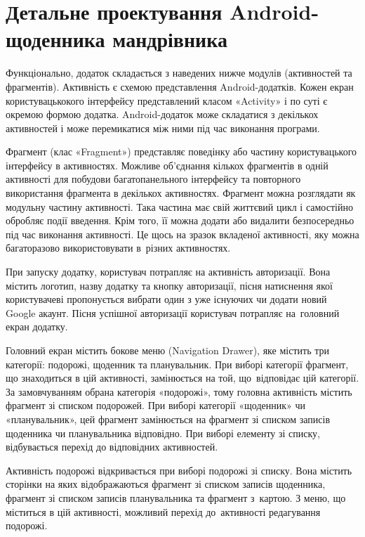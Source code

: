 \documentclass[../main.tex]{subfiles}
\begin{document}
\section{Детальне проектування Android-щоденника мандрівника}
Функціонально, додаток складається з наведених нижче модулів (активностей та фрагментів). Активність є схемою представлення Android-додатків. Кожен екран користувацькокого інтерфейсу представлений класом «Activity» і по суті є окремою формою додатка. Android-додаток може складатися з декількох активностей і може перемикатися між ними під час виконання програми. 

Фрагмент (клас «Fragment») представляє поведінку або частину користувацького інтерфейсу в активностях. Можливе об'єднання кількох фрагментів в одній активності для побудови багатопанельного інтерфейсу та повторного використання фрагмента в декількох активностях. Фрагмент можна розглядати як модульну частину активності. Така частина має свій життєвий цикл і самостійно обробляє події введення. Крім того, її можна додати або видалити безпосередньо під час виконання активності. Це щось на зразок вкладеної активності, яку можна багаторазово використовувати в~різних активностях.

При запуску додатку, користувач потрапляє на активність авторизації. Вона містить логотип, назву додатку та кнопку авторизації, пісня натиснення якої  користувачеві пропонується вибрати один з уже існуючих чи додати новий Google акаунт. Пісня успішної авторизації користувач потрапляє на~головний екран додатку.

Головний екран містить бокове меню (Navigation Drawer), яке містить три категорії: подорожі, щоденник та планувальник. При виборі категорії фрагмент, що знаходиться в цій активності, замінюється на той, що~відповідає цій категорії. За замовчуванням обрана категорія «подорожі», тому головна активність містить фрагмент зі списком подорожей. При виборі категорії «щоденник» чи «планувальник», цей фрагмент замінюється на фрагмент зі списком записів щоденника чи планувальника відповідно. При виборі елементу зі списку, відбувається перехід до відповідних активностей.

Активність подорожі відкривається при виборі подорожі зі списку. Вона містить сторінки на яких відображаються фрагмент зі списком записів щоденника, фрагмент зі списком записів планувальника та фрагмент з~картою. З меню, що міститься в цій активності, можливий перехід до~активності редагування подорожі.
\end{document}
